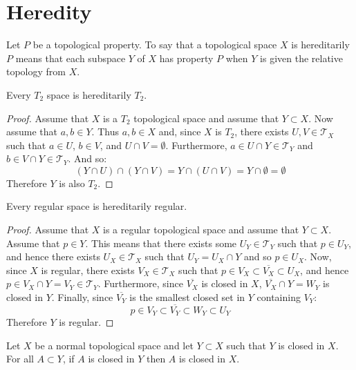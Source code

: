 \documentclass[letterpaper,12pt,fleqn]{article}
\newcommand{\T}{\mathscr{T}}
\begin{document}
\section*{Heredity}

\begin{definition}[Heredity]
  Let \(P\) be a topological property.  To say that a topological space \(X\) is hereditarily \(P\) means that each
  subspace \(Y\) of \(X\) has property \(P\) when \(Y\) is given the relative topology from \(X\).
\end{definition}

\begin{theorem}
  Every \(T_2\) space is hereditarily \(T_2\).
\end{theorem}

\begin{proof}
  Assume that \(X\) is a \(T_2\) topological space and assume that \(Y\subset X\).  Now assume that \(a,b\in Y\).
  Thus \(a,b\in X\) and, since \(X\) is \(T_2\), there exists \(U,V\in\T_X\) such that \(a\in U\), \(b\in V\), and
  \(U\cap V=\emptyset\).  Furthermore, \(a\in U\cap Y\in\T_Y\) and \(b\in V\cap Y\in\T_Y\).  And so:
  \[(Y\cap U)\cap(Y\cap V)=Y\cap(U\cap V)=Y\cap\emptyset=\emptyset\]
  Therefore \(Y\) is also \(T_2\).
\end{proof}

\begin{theorem}
  Every regular space is hereditarily regular.
\end{theorem}

\begin{proof}
  Assume that \(X\) is a regular topological space and assume that \(Y\subset X\).  Assume that \(p\in Y\).  This
  means that there exists some \(U_Y\in\T_Y\) such that \(p\in U_Y\), and hence there exists \(U_X\in\T_X\) such
  that \(U_Y=U_X\cap Y\) and so \(p\in U_X\).  Now, since \(X\) is regular, there exists \(V_X\in\T_X\) such that
  \(p\in V_X\subset\overline{V_X}\subset U_X\), and hence \(p\in V_X\cap Y=V_Y\in\T_Y\).  Furthermore, since
  \(\overline{V_X}\) is closed in \(X\), \(\overline{V_X}\cap Y=W_Y\) is closed in \(Y\).  Finally, since
  \(\overline{V_Y}\) is the smallest closed set in \(Y\) containing \(V_Y\):
  \[p\in V_Y\subset\overline{V_Y}\subset W_Y\subset U_Y\]
  Therefore \(Y\) is regular.
\end{proof}

\begin{lemma}
  Let \(X\) be a normal topological space and let \(Y\subset X\) such that \(Y\) is closed in \(X\).  For all
  \(A\subset Y\), if \(A\) is closed in \(Y\) then \(A\) is closed in \(X\).
\end{lemma}
\end{document}
